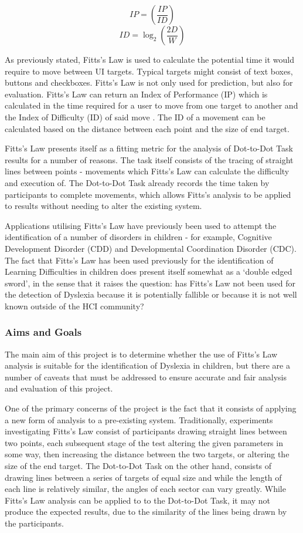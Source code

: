 			\[IP = \left(\frac{IP}{ID}\right)\]
			\[ID = \log_2\left( \frac{2D}{W}\right)\]
			
			As previously stated, Fitts’s Law is used to calculate the potential time it would require to move between UI targets. Typical targets might consist of text boxes, buttons and checkboxes. Fitts’s Law is not only used for prediction, but also for evaluation. Fitts’s Law can return an Index of Performance (IP) which is calculated in the time required for a user to move from one target to another and the Index of Difficulty (ID) of said move \cite{Fitts1954}.  The ID of a movement can be calculated based on the distance between each point and the size of end target.

			Fitts’s Law presents itself as a fitting metric for the analysis of Dot-to-Dot Task results for a number of reasons. The task itself consists of the tracing of straight lines between points  - movements which Fitts’s Law can calculate the difficulty and execution of. The Dot-to-Dot Task already records the time taken by participants to complete movements, which allows Fitts’s analysis to be applied to results without needing to alter the existing system.

			Applications utilising Fitts’s Law have previously been used to attempt the identification of a number of disorders in children - for example, Cognitive Development Disorder (CDD) and Developmental Coordination Disorder (CDC). The fact that Fitts’s Law has been used previously for the identification of Learning Difficulties in children does present itself somewhat as a ‘double edged sword’, in the sense that it raises the question: has Fitts’s Law not been used for the detection of Dyslexia because it is potentially fallible or because it is not well known outside of the HCI community?
		
		\subsubsection{Aims and Goals}
			The main aim of this project is to determine whether the use of Fitts’s Law analysis is  suitable for the identification of Dyslexia in children, but there are a number of caveats that must be addressed to ensure accurate and fair analysis and evaluation of this project. 
		
			One of the primary concerns of the project is the fact that it consists of applying a new form of analysis to a pre-existing system. Traditionally, experiments investigating Fitts’s Law consist of participants drawing straight lines between two points, each subsequent stage of the test altering the given parameters in some way, then increasing the distance between the two targets, or altering the size of the end target. The Dot-to-Dot Task on the other hand, consists of drawing lines between a series of targets of equal size and while the length of each line is relatively similar, the angles of each sector can vary greatly. While Fitts’s Law analysis can be applied to to the Dot-to-Dot Task, it may not produce the expected results, due to the similarity of the lines being drawn by the participants.
		
